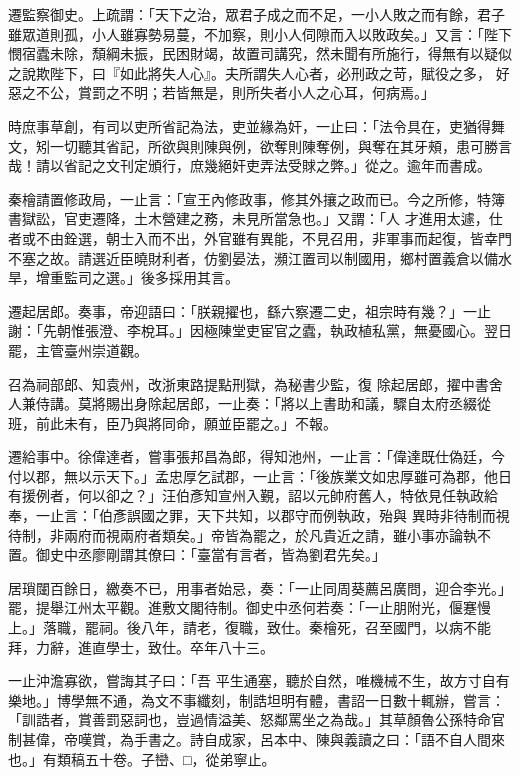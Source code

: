 \begin{pinyinscope}
 遷監察御史。上疏謂：「天下之治，眾君子成之而不足，一小人敗之而有餘，君子雖眾道則孤，小人雖寡勢易蔓，不加察，則小人伺隙而入以敗政矣。」又言：「陛下憫宿蠹未除，頹綱未振，民困財竭，故置司講究，然未聞有所施行，得無有以疑似之說欺陛下，曰『如此將失人心』。夫所謂失人心者，必刑政之苛，賦役之多，
 好惡之不公，賞罰之不明；若皆無是，則所失者小人之心耳，何病焉。」



 時庶事草創，有司以吏所省記為法，吏並緣為奸，一止曰：「法令具在，吏猶得舞文，矧一切聽其省記，所欲與則陳與例，欲奪則陳奪例，與奪在其牙頰，患可勝言哉！請以省記之文刊定頒行，庶幾絕奸吏弄法受賕之弊。」從之。逾年而書成。



 秦檜請置修政局，一止言：「宣王內修政事，修其外攘之政而已。今之所修，特簿書獄訟，官吏遷降，土木營建之務，未見所當急也。」又謂：「人
 才進用太遽，仕者或不由銓選，朝士入而不出，外官雖有異能，不見召用，非軍事而起復，皆幸門不塞之故。請選近臣曉財利者，仿劉晏法，瀕江置司以制國用，鄉村置義倉以備水旱，增重監司之選。」後多採用其言。



 遷起居郎。奏事，帝迎語曰：「朕親擢也，繇六察遷二史，祖宗時有幾？」一止謝：「先朝惟張澄、李梲耳。」因極陳堂吏宦官之蠹，執政植私黨，無憂國心。翌日罷，主管臺州崇道觀。



 召為祠部郎、知袁州，改浙東路提點刑獄，為秘書少監，復
 除起居郎，擢中書舍人兼侍講。莫將賜出身除起居郎，一止奏：「將以上書助和議，驟自太府丞綴從班，前此未有，臣乃與將同命，願並臣罷之。」不報。



 遷給事中。徐偉達者，嘗事張邦昌為郎，得知池州，一止言：「偉達既仕偽廷，今付以郡，無以示天下。」孟忠厚乞試郡，一止言：「後族業文如忠厚雖可為郡，他日有援例者，何以卻之？」汪伯彥知宣州入覲，詔以元帥府舊人，特依見任執政給奉，一止言：「伯彥誤國之罪，天下共知，以郡守而例執政，殆與
 異時非待制而視待制，非兩府而視兩府者類矣。」帝皆為罷之，於凡貴近之請，雖小事亦論執不置。御史中丞廖剛謂其僚曰：「臺當有言者，皆為劉君先矣。」



 居瑣闥百餘日，繳奏不已，用事者始忌，奏：「一止同周葵薦呂廣問，迎合李光。」罷，提舉江州太平觀。進敷文閣待制。御史中丞何若奏：「一止朋附光，偃蹇慢上。」落職，罷祠。後八年，請老，復職，致仕。秦檜死，召至國門，以病不能拜，力辭，進直學士，致仕。卒年八十三。



 一止沖澹寡欲，嘗誨其子曰：「吾
 平生通塞，聽於自然，唯機械不生，故方寸自有樂地。」博學無不通，為文不事纖刻，制誥坦明有體，書詔一日數十輒辦，嘗言：「訓誥者，賞善罰惡詞也，豈過情溢美、怒鄰罵坐之為哉。」其草顏魯公孫特命官制甚偉，帝嘆賞，為手書之。詩自成家，呂本中、陳與義讀之曰：「語不自人間來也。」有類稿五十卷。子巒、□，從弟寧止。




\end{pinyinscope}
